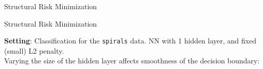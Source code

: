\documentclass[11pt,compress,t,notes=noshow, xcolor=table]{beamer}
\begin{document}
\begin{vbframe} {Structural Risk Minimization}
\end{vbframe}

\begin{frame} {Structural Risk Minimization}

\small

\textbf{Setting}: Classification for the \texttt{spirals} data.
NN with 1 hidden layer, and fixed (small) L2 penalty. \\
Varying the size of the hidden layer affects smoothness of the decision boundary:


\vfill


\end{frame}
\end{document}
